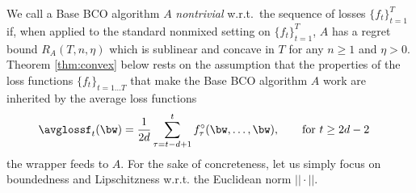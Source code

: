 %
We call a Base BCO algorithm $A$ {\em nontrivial} w.r.t.\ the sequence of losses $\{f_t\}_{t=1}^T$ if, when applied to the standard nonmixed setting on $\{f_t\}_{t=1}^T$, $A$ has a regret bound $R_A(T,n,\eta)$ which is sublinear and concave in $T$ for any $n \geq 1$ and $\eta > 0$.
%
Theorem \ref{thm:convex} below rests on the assumption that the properties of the loss functions $\{f_t\}_{t=1\dots T}$ that make the Base BCO algorithm $A$ work are inherited by the average loss functions
%
\begin{align*}
\avglossf_t(\bw) &= \frac{1}{2d}\sum_{\tau=t-d+1}^t \fcomp_\tau(\bw,\dots,\bw),\qquad {\mbox{for $t \geq 2d-2$}}
\end{align*}
%
the wrapper feeds to $A$. For the sake of concreteness, let us simply focus on boundedness and Lipschitzness w.r.t. the Euclidean norm $||\cdot||$. 

